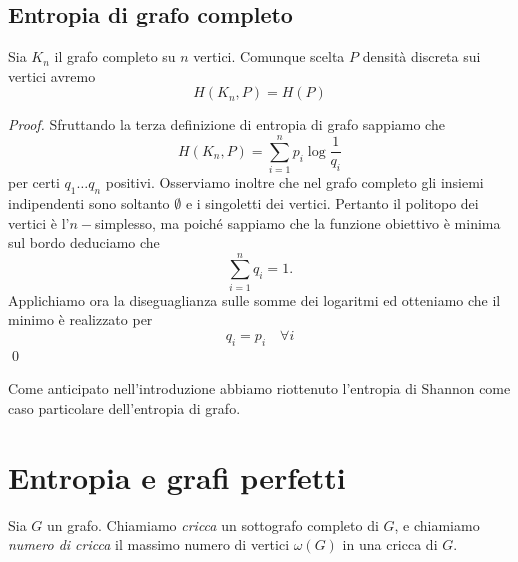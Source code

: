 \subsection{Entropia di grafo completo} 
\begin{proposition}
	Sia \(K_n\) il grafo completo su \(n\) vertici. Comunque scelta \(P\) densità discreta sui vertici avremo
	\[H(K_n,P)=H(P)\]
\end{proposition}
\begin{proof}
	Sfruttando la terza definizione di entropia di grafo sappiamo che
	\[H(K_n,P)=\sum_{i=1}^n p_i \log{\frac{1}{q_i}}\]
	per certi \(q_1\dots q_n\) positivi. Osserviamo inoltre che nel grafo completo gli insiemi indipendenti sono soltanto \(\emptyset\) e i singoletti dei vertici. Pertanto il politopo dei vertici è l'\(n-\)simplesso, ma poiché sappiamo che la funzione obiettivo è minima sul bordo deduciamo che
	\[\sum_{i=1}^n q_i = 1.\]
	Applichiamo ora la diseguaglianza sulle somme dei logaritmi ed otteniamo che il minimo è realizzato per
	\[q_i = p_i\quad \forall i\]
	\qed 
\end{proof}
\begin{remark}
	Come anticipato nell'introduzione abbiamo riottenuto l'entropia di Shannon come caso particolare dell'entropia di grafo. 
\end{remark}

\section{Entropia e grafi perfetti} 

\begin{definition}
  Sia \(G\) un grafo. Chiamiamo \emph{cricca} un sottografo completo di \(G\), e chiamiamo \emph{numero di cricca} il massimo numero di vertici \(\omega(G)\) in una cricca di \(G\).
\end{definition}


